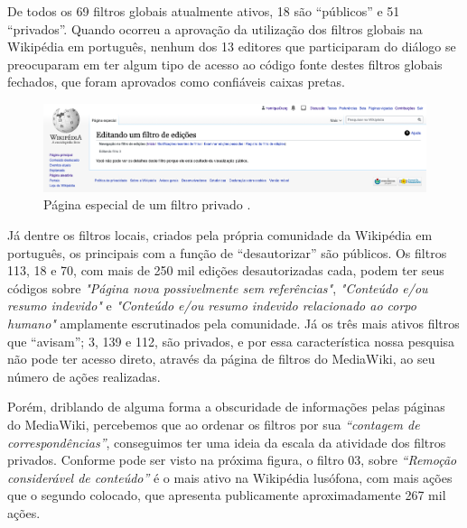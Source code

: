 De todos os 69 filtros globais atualmente ativos, 18 são ``públicos'' e 51 ``privados''. Quando ocorreu a aprovação da utilização dos filtros globais na Wikipédia em português, nenhum dos 13 editores que participaram do diálogo se preocuparam em ter algum tipo de acesso ao código fonte destes filtros globais fechados, que foram aprovados como confiáveis caixas pretas. 

\begin{figure}[H]
    \centering
    \includegraphics[width=1\textwidth]{Images/pagina_filtro_privado.png}
    \caption{Página especial de um filtro privado .}
    \label{fig:pagina_filtro_privado}
\end{figure}



Já dentre os filtros locais, criados pela própria comunidade da Wikipédia em português, os principais com a função de ``desautorizar'' são públicos. Os filtros 113, 18 e 70, com mais de 250 mil edições desautorizadas cada, podem ter seus códigos sobre \textit{"Página nova possivelmente sem referências"}, \textit{"Conteúdo e/ou resumo indevido"} e \textit{"Conteúdo e/ou resumo indevido relacionado ao corpo humano"} amplamente escrutinados pela comunidade. Já os três mais ativos filtros que ``avisam''; 3, 139 e 112, são privados, e por essa característica nossa pesquisa não pode ter acesso direto, através da página de filtros do MediaWiki, ao seu número de ações realizadas.

Porém, driblando de alguma forma a obscuridade de informações pelas páginas do MediaWiki, percebemos que ao ordenar os filtros por sua \textit{``contagem de correspondências''}, conseguimos ter uma ideia da escala da atividade dos filtros privados. Conforme pode ser visto na próxima figura, o filtro 03, sobre \textit{``Remoção considerável de conteúdo''} é o mais ativo na Wikipédia lusófona, com mais ações que o segundo colocado, que apresenta publicamente aproximadamente 267 mil ações.

